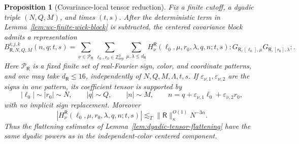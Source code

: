 \documentclass[10pt]{amsart}
\numberwithin{equation}{section}
\theoremstyle{plain}
\newtheorem{proposition}[theorem]{Proposition}
\theoremstyle{definition}
\theoremstyle{remark}
\begin{document}
\begin{proposition}[Covariance-local tensor reduction]\label{prop:wc-covariance-local-tensor}
Fix a finite cutoff, a dyadic triple \((N,Q,M)\), and times \((t,s)\).  After the deterministic term in Lemma~\ref{lem:wc-finite-wick-block} is subtracted, the centered covariance block admits a representation
\begin{equation}\label{eq:wc-covariance-local-tensor}
        B_{\mathsf R,N,Q,M}^{i;j,k}(n,q;t,s)
        =\sum_{\nu\in\mathcal P_{\mathsf R}}
        \sum_{\ell_0,r_0\in\mathbb Z^3_{\mathrm{rep}}}
        \sum_{\mu,\lambda\le d_{\mathsf R}}
        H_{\nu}^{\mathsf R}(\ell_0,\mu,r_0,\lambda,q,n;t,s)
        :G_{\mathsf R,[\ell_0],\mu}G_{\mathsf R,[r_0],\lambda}:.
\end{equation}
Here \(\mathcal P_{\mathsf R}\) is a fixed finite set of real-Fourier sign, color, and coordinate patterns, and one may take \(d_{\mathsf R}\le16\), independently of \(N,Q,M,\Lambda,t,s\).  If $\varepsilon_{\nu,1},\varepsilon_{\nu,2}$ are the signs in one pattern, its coefficient tensor is supported by
\begin{equation}\label{eq:wc-covariance-local-support}
        |\ell_0|\sim |r_0|\sim N,
        \qquad |q|\sim Q,
        \qquad |n|\sim M,
        \qquad n=q+\varepsilon_{\nu,1}\ell_0
                     +\varepsilon_{\nu,2}r_0,
\end{equation}
with no implicit sign replacement.  Moreover
\begin{equation}\label{eq:wc-covariance-local-size}
        |H_{\nu}^{\mathsf R}(\ell_0,\mu,r_0,\lambda,q,n;t,s)|
        \lesssim_T \|\mathsf R\|_{\kappa}^{O(1)}N^{-3\alpha}.
\end{equation}
Thus the flattening estimates of Lemma~\ref{lem:dyadic-tensor-flattening} have the same dyadic powers as in the independent-color centered component.
\end{proposition}
\end{document}
